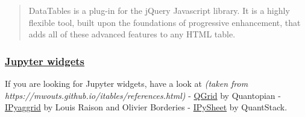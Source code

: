 \documentclass[
  letterpaper,
  DIV=11,
  numbers=noendperiod]{scrartcl}
\begin{document}
\begin{quote}
DataTables is a plug-in for the jQuery Javascript library. It is a
highly flexible tool, built upon the foundations of progressive
enhancement, that adds all of these advanced features to any HTML table.
\end{quote}

\hypertarget{jupyter-widgets}{%
\subsubsection{\texorpdfstring{\href{https://ipywidgets.readthedocs.io/en/stable/}{Jupyter
widgets}}{Jupyter widgets}}\label{jupyter-widgets}}

If you are looking for Jupyter widgets, have a look at \emph{(taken from
https://mwouts.github.io/itables/references.html)} -
\href{https://github.com/quantopian/qgrid}{QGrid} by Quantopian -
\href{https://dgothrek.gitlab.io/ipyaggrid/}{IPyaggrid} by Louis Raison
and Olivier Borderies -
\href{https://github.com/QuantStack/ipysheet}{IPySheet} by QuantStack.
\end{document}
